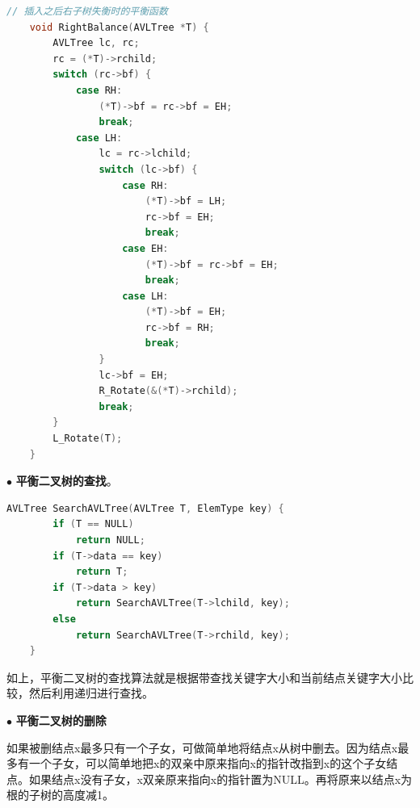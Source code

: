 
\begin{lstlisting}[language=C, caption={插入后对右子树的平衡化处理}]
    // 插入之后右子树失衡时的平衡函数
    void RightBalance(AVLTree *T) {
        AVLTree lc, rc;
        rc = (*T)->rchild;
        switch (rc->bf) {
            case RH:
                (*T)->bf = rc->bf = EH;
                break;
            case LH:
                lc = rc->lchild;
                switch (lc->bf) {
                    case RH:
                        (*T)->bf = LH;
                        rc->bf = EH;
                        break;
                    case EH:
                        (*T)->bf = rc->bf = EH;
                        break;
                    case LH:
                        (*T)->bf = EH;
                        rc->bf = RH;
                        break;
                }
                lc->bf = EH;
                R_Rotate(&(*T)->rchild);
                break;
        }
        L_Rotate(T);
    }
\end{lstlisting}

\vspace{1ex}

\noindent
$\bullet$
\textbf{平衡二叉树的查找}。


\begin{lstlisting}[language=C, caption={平衡二叉树的查找}]
    AVLTree SearchAVLTree(AVLTree T, ElemType key) {
        if (T == NULL)
            return NULL;
        if (T->data == key)
            return T;
        if (T->data > key)
            return SearchAVLTree(T->lchild, key);
        else
            return SearchAVLTree(T->rchild, key);
    }
\end{lstlisting}

如上，平衡二叉树的查找算法就是根据带查找关键字大小和当前结点关键字大小比较，然后利用递归进行查找。

\vspace{1ex}

\noindent
$\bullet$
\textbf{平衡二叉树的删除}

如果被删结点x最多只有一个子女，可做简单地将结点x从树中删去。因为结点x最多有一个子女，可以简单地把x的双亲中原来指向x的指针改指到x的这个子女结点。如果结点x没有子女，x双亲原来指向x的指针置为NULL。再将原来以结点x为根的子树的高度减1。

